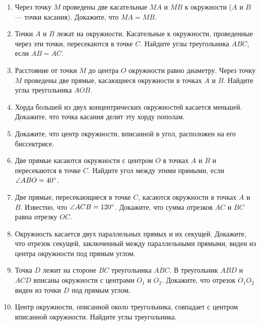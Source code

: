 \documentclass[12pt, a4paper]{article}
\begin{document}
	
	\begin{enumerate}
		\item Через точку $M$ проведены две касательные $MA$ и $MB$ к окружности ($A$ и $B$ — точки касания). Докажите,
		что $MA = MB$.
		\item Точки $A$ и $B$ лежат на окружности. Касательные к окружности, проведенные через эти точки, пересекаются в точке $C$. Найдите углы треугольника $ABC$, если $AB = AC$.
		\item Расстояние от точки $M$ до центра $O$ окружности равно диаметру. Через точку $M$ проведены две прямые, касающиеся окружности в точках $A$ и $B$. Найдите углы треугольника $AOB$.
		\item Хорда большей из двух концентрических окружностей касается меньшей. Докажите, что точка касания делит эту хорду пополам.
		\item Докажите, что центр окружности, вписанной в угол, расположен на его биссектрисе.
		\item Две прямые касаются окружности с центром $O$ в точках $A$ и $B$ и пересекаются в точке $C$. Найдите угол между этими
		прямыми, если $\angle ABO = 40 \degree$.
		\item Две прямые, пересекающиеся в точке $C$, касаются окружности в точках $A$ и $B$. Известно, что $\angle ACB = 120 \degree$. Докажите, что сумма отрезков $AC$ и $BC$ равна отрезку $OC$.
		\item Окружность касается двух параллельных прямых и
		их секущей. Докажите, что отрезок секущей, заключенный между параллельными прямыми, виден из центра окружности под
		прямым углом.
		\item Точка $D$ лежит на стороне $BC$ треугольника $ABC$. В треугольник $ABD$ и $ACD$ вписаны окружности с центрами $O_1$ и $O_2$. Докажите, что отрезок $O_1O_2$ виден из точки $D$ под прямым углом.
		\item Центр окружности, описанной около треугольника,	совпадает с центром вписанной окружности. Найдите углы треугольника.
	\end{enumerate}
\end{document}
